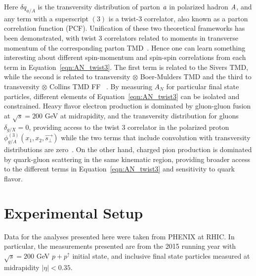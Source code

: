 \documentclass[submission, Proceedings]{SciPost}
\begin{document}
Here $\delta q_{a/A}$ is the transversity distribution of parton $\it{a}$ in polarized hadron $\it{A}$, and any term with a superscript $(3)$ is a twist-3 correlator, also known as a parton correlation function (PCF). Unification of these two theoretical frameworks has been demonstrated, with twist 3 correlators related to moments in transverse momentum of the corresponding parton TMD~\cite{pitonyak}. Hence one can learn something interesting about different spin-momentum and spin-spin correlations from each term in Equation~\ref{eqn:AN_twist3}. The first term is related to the Sivers TMD, while the second is related to transversity $\otimes$ Boer-Mulders TMD and the third to transversity $\otimes$ Collins TMD FF ~\cite{twist3_TMD_types}. By measuring $A_{N}$ for particular final state particles, different elements of Equation~\ref{eqn:AN_twist3} can be isolated and constrained. Heavy flavor electron production is dominated by gluon-gluon fusion at $\sqrt{s} = 200$ GeV at midrapidity, and the transversity distribution for gluons $\delta_{g/X} = 0$, providing access to the twist 3 correlator in the polarized proton $\phi^{(3)}_{g/A} (x_{1},x_{2},\vec{s_{\perp}})$ while the two terms that include convolution with transversity distributions are zero~\cite{forwardjpsi}. On the other hand, charged pion production is dominated by quark-gluon scattering in the same kinematic region, providing broader access to the different terms in Equation~\ref{eqn:AN_twist3} and sensitivity to quark flavor.	

\section{Experimental Setup}\label{sec:ana}
Data for the analyses presented here were taken from PHENIX at RHIC. In particular, the measurements presented are from the 2015 running year with $\sqrt{s} = 200$ GeV $p+p^{\uparrow}$ initial state, and inclusive final state particles measured at midrapidity $\mid \eta \mid < 0.35$.
\end{document}

